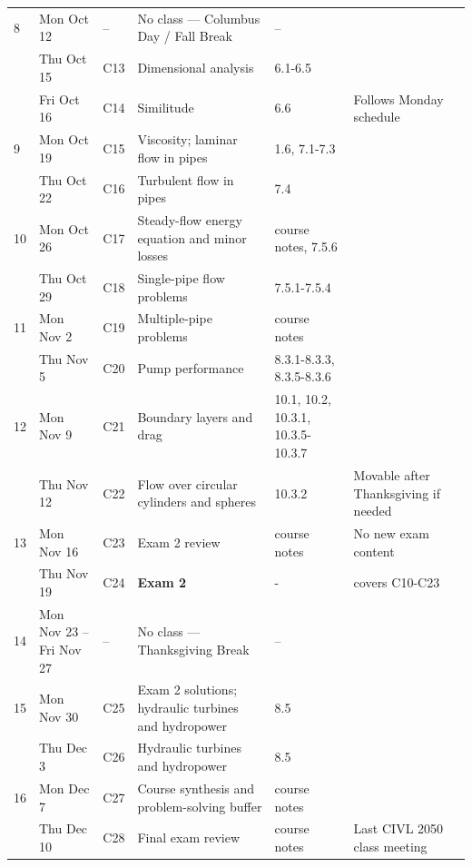\begin{longtable}{@{}C{0.027\textwidth} L{0.125\textwidth} C{0.040\textwidth} L{0.360\textwidth} L{0.150\textwidth} L{0.230\textwidth}@{}}
\midrule{}
 8 & Mon Oct 12 & -- & No class --- Columbus Day / Fall Break & -- & \\
  & Thu Oct 15 & C13 & Dimensional analysis & 6.1-6.5 & {\footnotesize } \\
  & Fri Oct 16 & C14 & Similitude & 6.6 & {\footnotesize Follows Monday schedule} \\
\midrule{}
 9 & Mon Oct 19 & C15 & Viscosity; laminar flow in pipes & 1.6, 7.1-7.3 & {\footnotesize } \\
  & Thu Oct 22 & C16 & Turbulent flow in pipes & 7.4 & {\footnotesize } \\
\midrule{}
 10 & Mon Oct 26 & C17 & Steady-flow energy equation and minor losses & course notes, 7.5.6 & {\footnotesize } \\
  & Thu Oct 29 & C18 & Single-pipe flow problems & 7.5.1-7.5.4 & {\footnotesize } \\
\midrule{}
 11 & Mon Nov 2 & C19 & Multiple-pipe problems & course notes & {\footnotesize } \\
  & Thu Nov 5 & C20 & Pump performance & 8.3.1-8.3.3, 8.3.5-8.3.6 & {\footnotesize } \\
\midrule{}
 12 & Mon Nov 9 & C21 & Boundary layers and drag & 10.1, 10.2, 10.3.1, 10.3.5-10.3.7 & {\footnotesize } \\
  & Thu Nov 12 & C22 & Flow over circular cylinders and spheres & 10.3.2 & {\footnotesize Movable after Thanksgiving if needed} \\
\midrule{}
 13 & Mon Nov 16 & C23 & Exam 2 review & course notes & {\footnotesize No new exam content} \\
  & Thu Nov 19 & C24 & \textbf{Exam 2} & - & {\footnotesize covers C10-C23} \\
\midrule{}
 14 & Mon Nov 23 -- Fri Nov 27 & -- & No class --- Thanksgiving Break & -- & \\
\midrule{}
 15 & Mon Nov 30 & C25 & Exam 2 solutions; hydraulic turbines and hydropower & 8.5 & {\footnotesize } \\
  & Thu Dec 3 & C26 & Hydraulic turbines and hydropower & 8.5 & {\footnotesize } \\
\midrule{}
 16 & Mon Dec 7 & C27 & Course synthesis and problem-solving buffer & course notes & {\footnotesize } \\
  & Thu Dec 10 & C28 & Final exam review & course notes & {\footnotesize Last CIVL 2050 class meeting} \\
\end{longtable}
